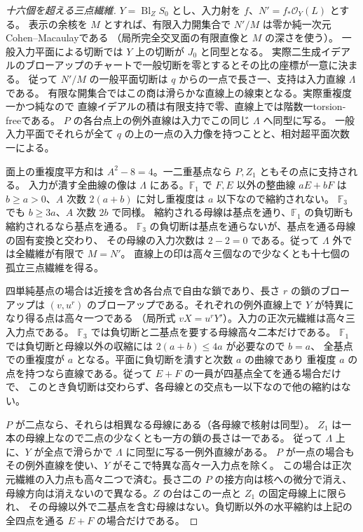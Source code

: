 \begin{proof}[十六個を超える三点繊維]
$Y=\operatorname{Bl}_Z S_0$ とし、入力射を $f$、$N'=f_*\mathcal O_Y(L)$ とする。
表示の余核を $M$ とすれば、有限入力開集合で $N'/M$ は零か純一次元Cohen--Macaulayである
（局所完全交叉面の有限直像と $M$ の深さを使う）。
一般入力平面による切断では $Y$ 上の切断が $J_0$ と同型となる。
実際二生成イデアルのブローアップのチャートで一般切断を零とするとその比の座標が一意に決まる。
従って $N'/M$ の一般平面切断は $q$ からの一点で長さ一、支持は入力直線 $\Lambda$ である。
有限な開集合ではこの商は滑らかな直線上の線束となる。実際重複度一かつ純なので
直線イデアルの積は有限支持で零、直線上では階数一torsion-freeである。
$P$ の各台点上の例外直線は入力でこの同じ $\Lambda$ へ同型に写る。
一般入力平面でそれらが全て $q$ の上の一点の入力像を持つことと、相対超平面次数一による。

面上の重複度平方和は $A^2-8=4$。一二重基点なら $P,Z_1$ ともその点に支持される。
入力が潰す全曲線の像は $\Lambda$ にある。$\mathbb F_1$ で $F,E$ 以外の整曲線
$aE+bF$ は $b\ge a>0$、$A$ 次数 $2(a+b)$ に対し重複度は $a$ 以下なので縮約されない。
$\mathbb F_3$ でも $b\ge3a$、$A$ 次数 $2b$ で同様。
縮約される母線は基点を通り、$\mathbb F_1$ の負切断も縮約されるなら基点を通る。
$\mathbb F_3$ の負切断は基点を通らないが、基点を通る母線の固有変換と交わり、
その母線の入力次数は $2-2=0$ である。従って $\Lambda$ 外では全繊維が有限で $M=N'$。
直線上の印は高々三個なので少なくとも十七個の孤立三点繊維を得る。

四単純基点の場合は近接を含め各台点で自由な鎖であり、長さ $r$ の鎖のブローアップは
$(v,u^r)$ のブローアップである。それぞれの例外直線上で $Y$ が特異になり得る点は高々一つである
（局所式 $vX=u^r Y'$）。入力の正次元繊維は高々三入力点である。
$\mathbb F_3$ では負切断と二基点を要する母線高々二本だけである。
$\mathbb F_1$ では負切断と母線以外の収縮には $2(a+b)\le4a$ が必要なので $b=a$、
全基点での重複度が $a$ となる。平面に負切断を潰すと次数 $a$ の曲線であり
重複度 $a$ の点を持つなら直線である。従って $E+F$ の一員が四基点全てを通る場合だけで、
このとき負切断は交わらず、各母線との交点も一以下なので他の縮約はない。

$P$ が二点なら、それらは相異なる母線にある（各母線で核射は同型）。
$Z_1$ は一本の母線上なので二点の少なくとも一方の鎖の長さは一である。
従って $\Lambda$ 上に、$Y$ が全点で滑らかで $\Lambda$ に同型に写る一例外直線がある。
$P$ が一点の場合もその例外直線を使い、$Y$ がそこで特異な高々一入力点を除く。
この場合は正次元繊維の入力点も高々二つで済む。長さ二の $P$ の接方向は核への微分で消え、
母線方向は消えないので異なる。$Z$ の台はこの一点と $Z_1$ の固定母線上に限られ、
その母線以外で二基点を含む母線はない。負切断以外の水平縮約は上記の全四点を通る
$E+F$ の場合だけである。


\end{proof}
